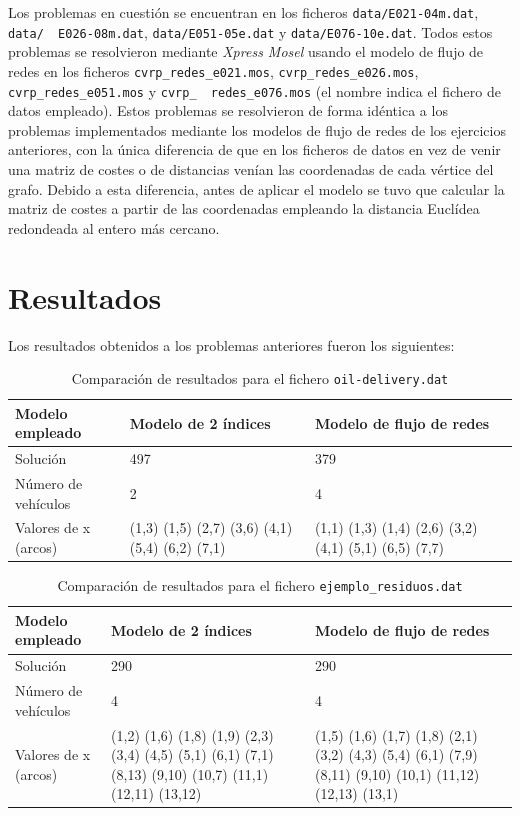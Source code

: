 \documentclass[a4paper,11pt]{article}
\begin{document}
\begin{enumerate}
Los problemas en cuestión se encuentran en los ficheros \texttt{data/E021-04m.dat}, \texttt{data/ \ E026-08m.dat}, \texttt{data/E051-05e.dat} y \texttt{data/E076-10e.dat}. Todos estos problemas se resolvieron mediante \textit{Xpress Mosel} usando el modelo de flujo de redes en los ficheros \texttt{cvrp\_redes\_e021.mos}, \texttt{cvrp\_redes\_e026.mos}, \texttt{cvrp\_redes\_e051.mos} y \texttt{cvrp\_ \ redes\_e076.mos} (el nombre indica el fichero de datos empleado). Estos problemas se resolvieron de forma idéntica a los problemas implementados mediante los modelos de flujo de redes de los ejercicios anteriores, con la única diferencia de que en los ficheros de datos en vez de venir una matriz de costes o de distancias venían las coordenadas de cada vértice del grafo. Debido a esta diferencia, antes de aplicar el modelo se tuvo que calcular la matriz de costes a partir de las coordenadas empleando la distancia Euclídea redondeada al entero más cercano.
\end{enumerate}

\section{Resultados}
Los resultados obtenidos a los problemas anteriores fueron los siguientes:

\begin{table}[!htbp]
\label{results_oil_delivery}
\centering
\begin{tabularx}{\textwidth}{|X|X|X|}
\hline
Modelo empleado	& Modelo de 2 índices	& Modelo de flujo de redes	\\ \hline
Solución	& 497	& 379	\\ \hline
Número de vehículos	& 2	& 4	\\ \hline
Valores de x (arcos)	& (1,3) (1,5) (2,7) (3,6) (4,1) (5,4) (6,2) (7,1)	& (1,1) (1,3) (1,4) (2,6) (3,2) (4,1) (5,1) (6,5) (7,7) \\ \hline
\end{tabularx}
\caption{Comparación de resultados para el fichero \texttt{oil-delivery.dat}}
\end{table}

\begin{table}[!htbp]
\label{results_residuos}
\centering
\begin{tabularx}{\textwidth}{|X|X|X|}
\hline
Modelo empleado	& Modelo de 2 índices	& Modelo de flujo de redes	\\ \hline
Solución	& 290	& 290	\\ \hline
Número de vehículos	& 4	& 4	\\ \hline
Valores de x (arcos)	& (1,2) (1,6) (1,8) (1,9) (2,3) (3,4) (4,5) (5,1) (6,1) (7,1) (8,13) (9,10) (10,7) (11,1) (12,11) (13,12)	& (1,5) (1,6) (1,7) (1,8) (2,1) (3,2) (4,3) (5,4) (6,1) (7,9) (8,11) (9,10) (10,1) (11,12) (12,13) (13,1)	\\ \hline
\end{tabularx}
\caption{Comparación de resultados para el fichero \texttt{ejemplo\_residuos.dat}}
\end{table}
\end{document}
